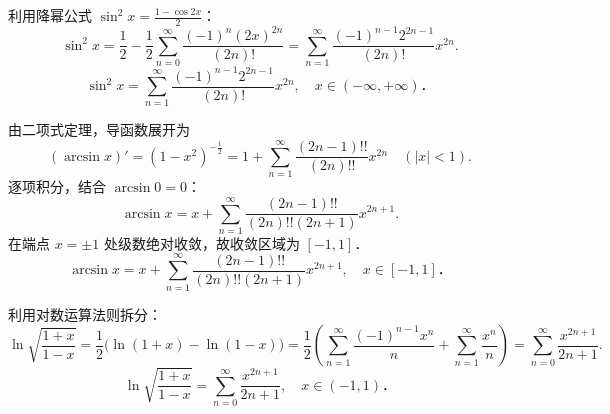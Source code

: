 \begin{solution}

    利用降幂公式 $\sin^2 x = \frac{1 - \cos 2x}{2}$：
    \begin{equation}
        \sin^2 x = \frac{1}{2} - \frac{1}{2}\sum_{n=0}^\infty \frac{(-1)^n (2x)^{2n}}{(2n)!} = \sum_{n=1}^\infty \frac{(-1)^{n-1} 2^{2n-1}}{(2n)!} x^{2n}.
    \end{equation}
    \begin{equation}
        \boxed{\sin^2 x = \sum_{n=1}^\infty \frac{(-1)^{n-1} 2^{2n-1}}{(2n)!} x^{2n}, \quad x \in (-\infty, +\infty)．}
    \end{equation}


    由二项式定理，导函数展开为
    \begin{equation}
        (\arcsin x)' = (1 - x^2)^{-\frac{1}{2}} = 1 + \sum_{n=1}^\infty \frac{(2n - 1)!!}{(2n)!!} x^{2n} \quad (|x| < 1).
    \end{equation}
    逐项积分，结合 $\arcsin 0 = 0$：
    \begin{equation}
        \arcsin x = x + \sum_{n=1}^\infty \frac{(2n - 1)!!}{(2n)!! (2n + 1)} x^{2n+1}.
    \end{equation}
    在端点 $x = \pm 1$ 处级数绝对收敛，故收敛区域为 $[-1, 1]$．
    \begin{equation}
        \boxed{\arcsin x = x + \sum_{n=1}^\infty \frac{(2n - 1)!!}{(2n)!! (2n + 1)} x^{2n+1}, \quad x \in [-1, 1]．}
    \end{equation}


    利用对数运算法则拆分：
    \begin{equation}
        \ln \sqrt{\frac{1 + x}{1 - x}} = \frac{1}{2}\bigl( \ln(1 + x) - \ln(1 - x) \bigr) = \frac{1}{2}\left( \sum_{n=1}^\infty \frac{(-1)^{n-1} x^n}{n} + \sum_{n=1}^\infty \frac{x^n}{n} \right) = \sum_{n=0}^\infty \frac{x^{2n+1}}{2n + 1}.
    \end{equation}
    \begin{equation}
        \boxed{\ln \sqrt{\frac{1 + x}{1 - x}} = \sum_{n=0}^\infty \frac{x^{2n+1}}{2n + 1}, \quad x \in (-1, 1)．}
    \end{equation}



\end{solution}
